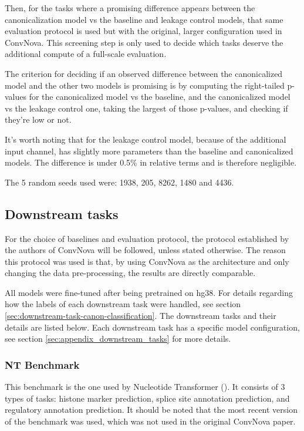 \documentclass[   ]{article}
\begin{document}
Then, for the tasks where a promising difference appears between the canonicalization model vs the baseline and leakage control models, that same evaluation protocol is used but with the original, larger configuration used in ConvNova. This screening step is only used to decide which tasks deserve the additional compute of a full-scale evaluation.

The criterion for deciding if an observed difference between the canonicalized model and the other two models is promising is by computing the right-tailed p-values for the canonicalized model vs the baseline, and the canonicalized model vs the leakage control one, taking the largest of those p-values, and checking if they're low or not.

It's worth noting that for the leakage control model, because of the additional input channel, has slightly more parameters than the baseline and canonicalized models. The difference is under 0.5\% in relative terms and is therefore negligible.

The 5 random seeds used were: 1938, 205, 8262, 1480 and 4436.

\subsection{Downstream tasks}
For the choice of baselines and evaluation protocol, the protocol established by the authors of ConvNova
\citep{boRevisitingConvolutionArchitecture2025} will be followed, unless stated
otherwise. The reason this protocol was used is that, by using ConvNova
as the architecture and only changing the data pre-processing, the
results are directly comparable.

All models were fine-tuned after being pretrained on hg38. For details
regarding how the labels of each downstream task were handled, see
section \ref{sec:downstream-task-canon-classification}. The downstream tasks and their details are listed below. Each downstream task has a specific model configuration, see section \ref{sec:appendix_downstream_tasks} for more details.

\subsubsection{NT Benchmark} 
This benchmark is the one used by Nucleotide Transformer
(\cite{dalla-torreNucleotideTransformerBuilding2025}). It consists of 3
types of tasks: histone marker prediction, splice site annotation
prediction, and regulatory annotation prediction. It should be noted
that the most recent version of the benchmark was used, which was not
used in the original ConvNova paper.
\end{document}
